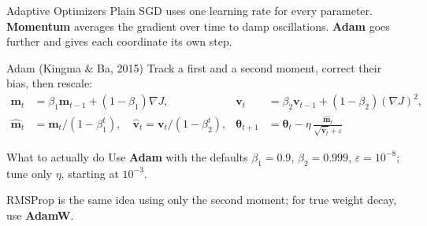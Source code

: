 \documentclass[aspectratio=169,11pt]{beamer}
\begin{document}
\begin{frame}{Adaptive Optimizers}
{\footnotesize Plain SGD uses one learning rate for every parameter.  \textbf{Momentum} averages the gradient over time to damp oscillations.  \textbf{Adam} goes further and gives each coordinate its own step.}

\vspace{0.2cm}
\begin{block}{Adam (Kingma \& Ba, 2015)}
\small
Track a first and a second moment, correct their bias, then rescale:
\begin{align*}
    \bm{m}_t &= \beta_1\bm{m}_{t-1} + (1-\beta_1)\nabla J, &
    \bm{v}_t &= \beta_2\bm{v}_{t-1} + (1-\beta_2)(\nabla J)^2, \\[2pt]
    \hat{\bm{m}}_t &= \bm{m}_t/(1-\beta_1^t), \quad
    \hat{\bm{v}}_t = \bm{v}_t/(1-\beta_2^t), &
    \bm{\theta}_{t+1} &= \bm{\theta}_t - \eta\,\frac{\hat{\bm{m}}_t}{\sqrt{\hat{\bm{v}}_t} + \varepsilon}
\end{align*}
\end{block}

\vspace{0.15cm}
\begin{exampleblock}{What to actually do}
\centering\small Use \textbf{Adam} with the defaults $\beta_1 = 0.9$, $\beta_2 = 0.999$, $\varepsilon = 10^{-8}$; tune only $\eta$, starting at $10^{-3}$.
\end{exampleblock}

\vspace{0.05cm}
{\footnotesize RMSProp is the same idea using only the second moment; for true weight decay, use \textbf{AdamW}.}
\end{frame}
\end{document}

